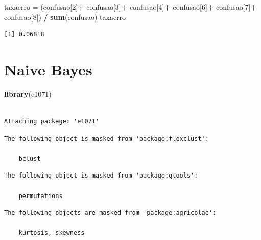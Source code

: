 \documentclass[12pt,brazil,oneside]{book}
\newenvironment{Shaded}{\begin{snugshade}}{\end{snugshade}}
\newcommand{\DecValTok}[1]{\textcolor[rgb]{0.00,0.00,0.81}{#1}}
\newcommand{\KeywordTok}[1]{\textcolor[rgb]{0.13,0.29,0.53}{\textbf{#1}}}
\newcommand{\NormalTok}[1]{#1}
\newcommand{\OperatorTok}[1]{\textcolor[rgb]{0.81,0.36,0.00}{\textbf{#1}}}
\newcommand{\StringTok}[1]{\textcolor[rgb]{0.31,0.60,0.02}{#1}}
\begin{document}
\begin{Shaded}
\begin{Highlighting}[]
\NormalTok{taxaerro =}\StringTok{ }\NormalTok{(confusao[}\DecValTok{2}\NormalTok{]}\OperatorTok{+}\StringTok{ }
\StringTok{            }\NormalTok{confusao[}\DecValTok{3}\NormalTok{]}\OperatorTok{+}
\StringTok{            }\NormalTok{confusao[}\DecValTok{4}\NormalTok{]}\OperatorTok{+}
\StringTok{            }\NormalTok{confusao[}\DecValTok{6}\NormalTok{]}\OperatorTok{+}
\StringTok{            }\NormalTok{confusao[}\DecValTok{7}\NormalTok{]}\OperatorTok{+}
\StringTok{            }\NormalTok{confusao[}\DecValTok{8}\NormalTok{]) }\OperatorTok{/}\StringTok{ }\KeywordTok{sum}\NormalTok{(confusao)}
\NormalTok{taxaerro}
\end{Highlighting}
\end{Shaded}

\begin{verbatim}
[1] 0.06818
\end{verbatim}

\hypertarget{naive-bayes}{%
\section{Naive Bayes}\label{naive-bayes}}

\begin{Shaded}
\begin{Highlighting}[]
\KeywordTok{library}\NormalTok{(e1071)}
\end{Highlighting}
\end{Shaded}

\begin{verbatim}

Attaching package: 'e1071'
\end{verbatim}

\begin{verbatim}
The following object is masked from 'package:flexclust':

    bclust
\end{verbatim}

\begin{verbatim}
The following object is masked from 'package:gtools':

    permutations
\end{verbatim}

\begin{verbatim}
The following objects are masked from 'package:agricolae':

    kurtosis, skewness
\end{verbatim}
\end{document}

